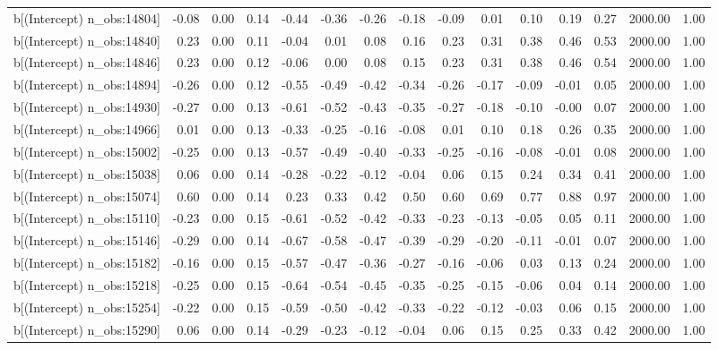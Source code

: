 \begin{table}[ht]
\begin{tabular}{rrrrrrrrrrrrrrr}
  b[(Intercept) n\_obs:14804] & -0.08 & 0.00 & 0.14 & -0.44 & -0.36 & -0.26 & -0.18 & -0.09 & 0.01 & 0.10 & 0.19 & 0.27 & 2000.00 & 1.00 \\ 
  b[(Intercept) n\_obs:14840] & 0.23 & 0.00 & 0.11 & -0.04 & 0.01 & 0.08 & 0.16 & 0.23 & 0.31 & 0.38 & 0.46 & 0.53 & 2000.00 & 1.00 \\ 
  b[(Intercept) n\_obs:14846] & 0.23 & 0.00 & 0.12 & -0.06 & 0.00 & 0.08 & 0.15 & 0.23 & 0.31 & 0.38 & 0.46 & 0.54 & 2000.00 & 1.00 \\ 
  b[(Intercept) n\_obs:14894] & -0.26 & 0.00 & 0.12 & -0.55 & -0.49 & -0.42 & -0.34 & -0.26 & -0.17 & -0.09 & -0.01 & 0.05 & 2000.00 & 1.00 \\ 
  b[(Intercept) n\_obs:14930] & -0.27 & 0.00 & 0.13 & -0.61 & -0.52 & -0.43 & -0.35 & -0.27 & -0.18 & -0.10 & -0.00 & 0.07 & 2000.00 & 1.00 \\ 
  b[(Intercept) n\_obs:14966] & 0.01 & 0.00 & 0.13 & -0.33 & -0.25 & -0.16 & -0.08 & 0.01 & 0.10 & 0.18 & 0.26 & 0.35 & 2000.00 & 1.00 \\ 
  b[(Intercept) n\_obs:15002] & -0.25 & 0.00 & 0.13 & -0.57 & -0.49 & -0.40 & -0.33 & -0.25 & -0.16 & -0.08 & -0.01 & 0.08 & 2000.00 & 1.00 \\ 
  b[(Intercept) n\_obs:15038] & 0.06 & 0.00 & 0.14 & -0.28 & -0.22 & -0.12 & -0.04 & 0.06 & 0.15 & 0.24 & 0.34 & 0.41 & 2000.00 & 1.00 \\ 
  b[(Intercept) n\_obs:15074] & 0.60 & 0.00 & 0.14 & 0.23 & 0.33 & 0.42 & 0.50 & 0.60 & 0.69 & 0.77 & 0.88 & 0.97 & 2000.00 & 1.00 \\ 
  b[(Intercept) n\_obs:15110] & -0.23 & 0.00 & 0.15 & -0.61 & -0.52 & -0.42 & -0.33 & -0.23 & -0.13 & -0.05 & 0.05 & 0.11 & 2000.00 & 1.00 \\ 
  b[(Intercept) n\_obs:15146] & -0.29 & 0.00 & 0.14 & -0.67 & -0.58 & -0.47 & -0.39 & -0.29 & -0.20 & -0.11 & -0.01 & 0.07 & 2000.00 & 1.00 \\ 
  b[(Intercept) n\_obs:15182] & -0.16 & 0.00 & 0.15 & -0.57 & -0.47 & -0.36 & -0.27 & -0.16 & -0.06 & 0.03 & 0.13 & 0.24 & 2000.00 & 1.00 \\ 
  b[(Intercept) n\_obs:15218] & -0.25 & 0.00 & 0.15 & -0.64 & -0.54 & -0.45 & -0.35 & -0.25 & -0.15 & -0.06 & 0.04 & 0.14 & 2000.00 & 1.00 \\ 
  b[(Intercept) n\_obs:15254] & -0.22 & 0.00 & 0.15 & -0.59 & -0.50 & -0.42 & -0.33 & -0.22 & -0.12 & -0.03 & 0.06 & 0.15 & 2000.00 & 1.00 \\ 
  b[(Intercept) n\_obs:15290] & 0.06 & 0.00 & 0.14 & -0.29 & -0.23 & -0.12 & -0.04 & 0.06 & 0.15 & 0.25 & 0.33 & 0.42 & 2000.00 & 1.00 \\ 

\end{tabular}
\end{table}
